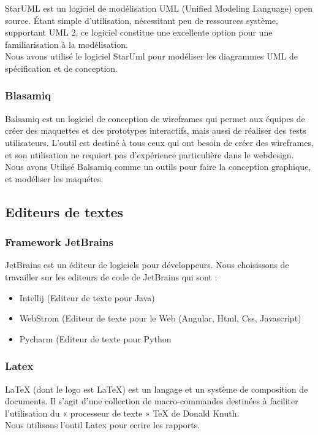 \documentclass[12pt]{report}
\begin{document}
StarUML est un logiciel de modélisation UML (Unified Modeling Language) open source. Étant simple d’utilisation, nécessitant peu de ressources système, supportant UML 2, ce logiciel constitue une excellente option pour une familiarisation à la modélisation\cite{27}.\\
Nous avons utilisé le logiciel StarUml pour modéliser les diagrammes UML de spécification et de conception.
\subsubsection{Blasamiq}

Balsamiq est un logiciel de conception de wireframes qui permet aux équipes de créer des maquettes et des prototypes interactifs, mais aussi de réaliser des tests utilisateurs. L’outil est destiné à tous ceux qui ont besoin de créer des wireframes, et son utilisation ne requiert pas d’expérience particulière dans le webdesign\cite{28}.\\
Nous avons Utilisé Balsamiq comme un outils pour faire la conception graphique, et modéliser les maquétes.

\subsection{Editeurs de textes}


\subsubsection{Framework JetBrains}

JetBrains est un éditeur de logiciels pour développeurs. Nous choisissons de travailler sur les editeurs de code de JetBrains qui sont : 
\begin{itemize}
\item Intellij (Editeur de texte pour Java)
\item WebStrom (Editeur de texte pour le Web (Angular, Html, Css, Javascript)
\item Pycharm (Editeur de texte pour Python
\end{itemize}


\subsubsection{Latex}

LaTeX (dont le logo est \LaTeX{}) est un langage et un système de composition de documents. Il s'agit d'une collection de macro-commandes destinées à faciliter l'utilisation du « processeur de texte » TeX de Donald Knuth\cite{29}.\\
Nous utilisons l'outil Latex pour ecrire les rapports.
\end{document}
